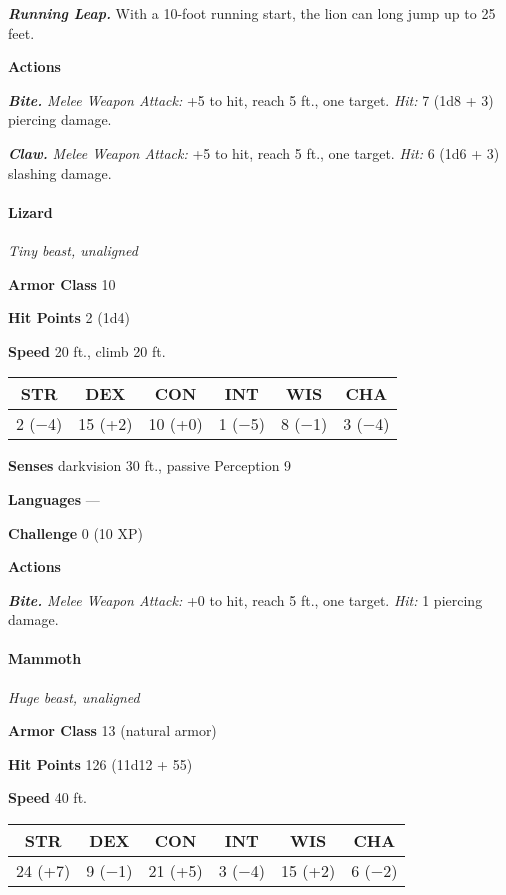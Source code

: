 \documentclass[
]{article}
\begin{document}
\emph{\textbf{Running Leap.}} With a 10-foot running start, the lion can
long jump up to 25 feet.

\textbf{Actions}

\emph{\textbf{Bite.}} \emph{Melee Weapon Attack:} +5 to hit, reach 5
ft., one target. \emph{Hit:} 7 (1d8 + 3) piercing damage.

\emph{\textbf{Claw.}} \emph{Melee Weapon Attack:} +5 to hit, reach 5
ft., one target. \emph{Hit:} 6 (1d6 + 3) slashing damage.

\hypertarget{lizard}{%
\paragraph{Lizard}\label{lizard}}

\emph{Tiny beast, unaligned}

\textbf{Armor Class} 10

\textbf{Hit Points} 2 (1d4)

\textbf{Speed} 20 ft., climb 20 ft.

\begin{longtable}[]{@{}cccccc@{}}
\toprule
STR & DEX & CON & INT & WIS & CHA\tabularnewline
\midrule
\endhead
2 (−4) & 15 (+2) & 10 (+0) & 1 (−5) & 8 (−1) & 3 (−4)\tabularnewline
\bottomrule
\end{longtable}

\textbf{Senses} darkvision 30 ft., passive Perception 9

\textbf{Languages} ---

\textbf{Challenge} 0 (10 XP)

\textbf{Actions}

\emph{\textbf{Bite.}} \emph{Melee Weapon Attack:} +0 to hit, reach 5
ft., one target. \emph{Hit:} 1 piercing damage.

\hypertarget{mammoth}{%
\paragraph{Mammoth}\label{mammoth}}

\emph{Huge beast, unaligned}

\textbf{Armor Class} 13 (natural armor)

\textbf{Hit Points} 126 (11d12 + 55)

\textbf{Speed} 40 ft.

\begin{longtable}[]{@{}cccccc@{}}
\toprule
STR & DEX & CON & INT & WIS & CHA\tabularnewline
\midrule
\endhead
24 (+7) & 9 (−1) & 21 (+5) & 3 (−4) & 15 (+2) & 6 (−2)\tabularnewline
\bottomrule
\end{longtable}
\end{document}
